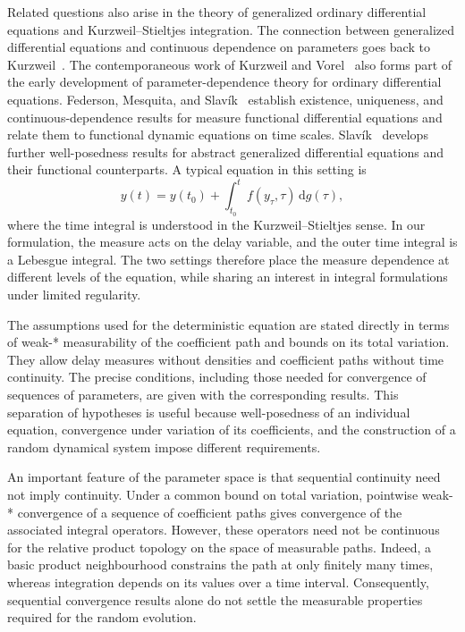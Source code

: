 \documentclass[reqno]{amsart}
\theoremstyle{plain}
\numberwithin{equation}{section}
\numberwithin{definition}{section}
\newcommand{\dd}{\ensuremath{\mathrm{d}}}
\begin{document}
Related questions also arise in the theory of generalized
ordinary differential equations and Kurzweil--Stieltjes
integration. The connection between generalized differential
equations and continuous dependence on parameters goes
back to Kurzweil~\cite{Kurzweil1957}.
The contemporaneous work of Kurzweil and
Vorel~\cite{KurzweilVorel1957} also forms part of
the early development of parameter-dependence theory
for ordinary differential equations.
Federson, Mesquita, and
Slav\'ik~\cite{FedersonMesquitaSlavik2012} establish
existence, uniqueness, and continuous-dependence results
for measure functional differential equations and relate
them to functional dynamic equations on time scales.
Slav\'ik~\cite{Slavik2015} develops further well-posedness
results for abstract generalized differential equations
and their functional counterparts.
A typical equation in this setting is
\begin{equation*}
    y(t)
    =
    y(t_0)
    +
    \int_{t_0}^{t} f(y_\tau,\tau)\,\dd g(\tau),
\end{equation*}
where the time integral is understood in the
Kurzweil--Stieltjes sense.
In our formulation, the measure acts on the delay variable,
and the outer time integral is a Lebesgue integral.
The two settings therefore place the measure dependence
at different levels of the equation, while sharing an
interest in integral formulations under limited regularity.

The assumptions used for the deterministic equation
are stated directly in terms of weak-* measurability
of the coefficient path and bounds on its total variation.
They allow delay measures without densities and coefficient
paths without time continuity. The precise conditions,
including those needed for convergence of sequences of
parameters, are given with the corresponding results.
This separation of hypotheses is useful because
well-posedness of an individual equation, convergence
under variation of its coefficients, and the construction
of a random dynamical system impose different requirements.

An important feature of the parameter space is that
sequential continuity need not imply continuity.
Under a common bound on total variation, pointwise weak-*
convergence of a sequence of coefficient paths gives
convergence of the associated integral operators.
However, these operators need not be continuous for the
relative product topology on the space of measurable paths.
Indeed, a basic product neighbourhood constrains the path
at only finitely many times, whereas integration depends
on its values over a time interval.
Consequently, sequential convergence results alone
do not settle the measurable properties required for
the random evolution.
\end{document}
